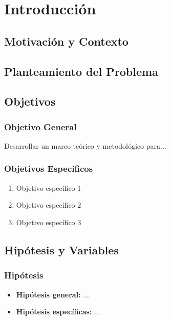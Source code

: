 \documentclass[12pt,a4paper,oneside]{book}
\theoremstyle{plain}
\theoremstyle{definition}
\theoremstyle{remark}
\begin{document}
\tableofcontents
\listoffigures
\listoftables

\mainmatter
{}

\chapter{Introducción}

\section{Motivación y Contexto}
\lipsum[4]

\section{Planteamiento del Problema}
\lipsum[5]

\section{Objetivos}

\subsection{Objetivo General}
Desarrollar un marco teórico y metodológico para...

\subsection{Objetivos Específicos}
\begin{enumerate}
    \item Objetivo específico 1
    \item Objetivo específico 2
    \item Objetivo específico 3
\end{enumerate}

\section{Hipótesis y Variables}

\subsection{Hipótesis}
\begin{itemize}
  \item \textbf{Hipótesis general:} ...
  \item \textbf{Hipótesis específicas:} ...
\end{itemize}
\end{document}
